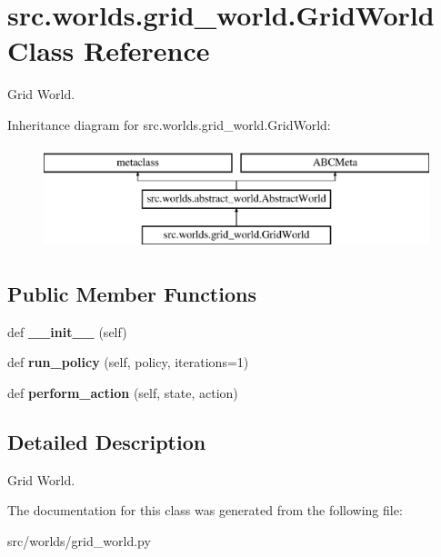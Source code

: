\hypertarget{classsrc_1_1worlds_1_1grid__world_1_1_grid_world}{}\section{src.\+worlds.\+grid\+\_\+world.\+Grid\+World Class Reference}
\label{classsrc_1_1worlds_1_1grid__world_1_1_grid_world}


Grid World.  


Inheritance diagram for src.\+worlds.\+grid\+\_\+world.\+Grid\+World\+:\begin{figure}[H]
\begin{center}
\leavevmode
\includegraphics[height=3.000000cm]{classsrc_1_1worlds_1_1grid__world_1_1_grid_world}
\end{center}
\end{figure}
\subsection*{Public Member Functions}
\begin{DoxyCompactItemize}
\item 
\mbox{\label{classsrc_1_1worlds_1_1grid__world_1_1_grid_world_afe3c1b392afbc00fb9a76c14a6e07899}} 
def {\bfseries \+\_\+\+\_\+init\+\_\+\+\_\+} (self)
\item 
\mbox{\label{classsrc_1_1worlds_1_1grid__world_1_1_grid_world_a2ec82897b648609647d645f9b5835593}} 
def {\bfseries run\+\_\+policy} (self, policy, iterations=1)
\item 
\mbox{\label{classsrc_1_1worlds_1_1grid__world_1_1_grid_world_a93de8a88475e8ad0530fe703343028c9}} 
def {\bfseries perform\+\_\+action} (self, state, action)
\end{DoxyCompactItemize}


\subsection{Detailed Description}
Grid World. 

The documentation for this class was generated from the following file\+:\begin{DoxyCompactItemize}
\item 
src/worlds/grid\+\_\+world.\+py\end{DoxyCompactItemize}
